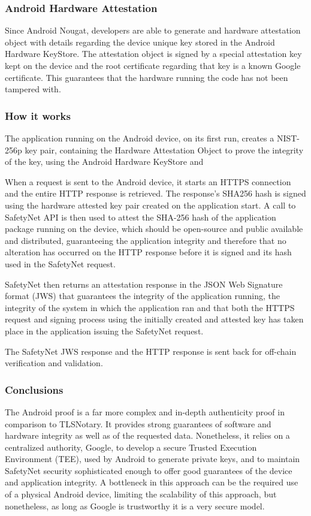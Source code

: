 \subsubsection{Android Hardware Attestation}
Since Android Nougat, developers are able to generate and hardware attestation object with details regarding the device unique key stored in the Android Hardware KeyStore. The attestation object is signed by a special attestation key kept on the device and the root certificate regarding that key is a known Google certificate. This guarantees that the hardware running the code has not been tampered with.

\subsubsection{How it works}
The application running on the Android device, on its first run, creates a NIST-256p key pair, containing the Hardware Attestation Object to prove the integrity of the key, using the Android Hardware KeyStore and

When a request is sent to the Android device, it starts an HTTPS connection and the entire HTTP response is retrieved. The response's SHA256 hash is signed using the hardware attested key pair created on the application start. A call to SafetyNet API is then used to attest the SHA-256 hash of the application package running on the device, which should be open-source and public available and distributed, guaranteeing the application integrity and therefore that no alteration has occurred on the HTTP response before it is signed and its hash used in the SafetyNet request.

SafetyNet then returns an attestation response in the JSON Web Signature format (JWS) that guarantees the integrity of the application running, the integrity of the system in which the application ran and that both the HTTPS request and signing process using the initially created and attested key has taken place in the application issuing the SafetyNet request.

The SafetyNet JWS response and the HTTP response is sent back for off-chain verification and validation.

\subsubsection{Conclusions}
The Android proof is a far more complex and in-depth authenticity proof in comparison to TLSNotary. It provides strong guarantees of software and hardware integrity as well as of the requested data. Nonetheless, it relies on a centralized authority, Google, to develop a secure Trusted Execution Environment (TEE), used by Android to generate private keys, and to maintain SafetyNet security sophisticated enough to offer good guarantees of the device and application integrity. A bottleneck in this approach can be the required use of a physical Android device, limiting the scalability of this approach, but nonetheless, as long as Google is trustworthy it is a very secure model.

